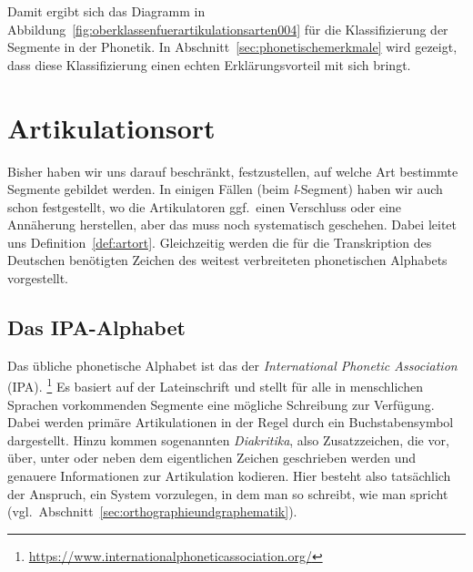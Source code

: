 
Damit ergibt sich das Diagramm in Abbildung~\ref{fig:oberklassenfuerartikulationsarten004} für die Klassifizierung der Segmente in der Phonetik.
In Abschnitt~\ref{sec:phonetischemerkmale} wird gezeigt, dass diese Klassifizierung einen echten Erklärungsvorteil mit sich bringt.


\section{Artikulationsort}
\label{sec:artikulationsort}

Bisher haben wir uns darauf beschränkt, festzustellen, auf welche Art bestimmte Segmente gebildet werden.
In einigen Fällen (\zB beim \textit{l}-Segment) haben wir auch schon festgestellt, wo die Artikulatoren ggf.\ einen Verschluss oder eine Annäherung herstellen, aber das muss noch systematisch geschehen.
Dabei leitet uns Definition~\ref{def:artort}.
Gleichzeitig werden die für die Transkription des Deutschen benötigten Zeichen des weitest verbreiteten phonetischen Alphabets vorgestellt.


\subsection{Das IPA-Alphabet}
\label{sec:dasipaalphabet}

Das übliche phonetische Alphabet ist das der \textit{International Phonetic Association} (IPA).%
\footnote{\url{https://www.internationalphoneticassociation.org/}}
Es basiert auf der Lateinschrift und stellt für alle in menschlichen Sprachen vorkommenden Segmente eine mögliche Schreibung zur Verfügung.
Dabei werden primäre Artikulationen in der Regel durch ein Buchstabensymbol dargestellt.
Hinzu kommen sogenannten \textit{Diakritika}, also Zusatzzeichen, die vor, über, unter oder neben dem eigentlichen Zeichen geschrieben werden und genauere Informationen zur Artikulation kodieren.
Hier besteht also tatsächlich der Anspruch, ein System vorzulegen, in dem man so schreibt, wie man spricht (vgl.\ Abschnitt~\ref{sec:orthographieundgraphematik}).

